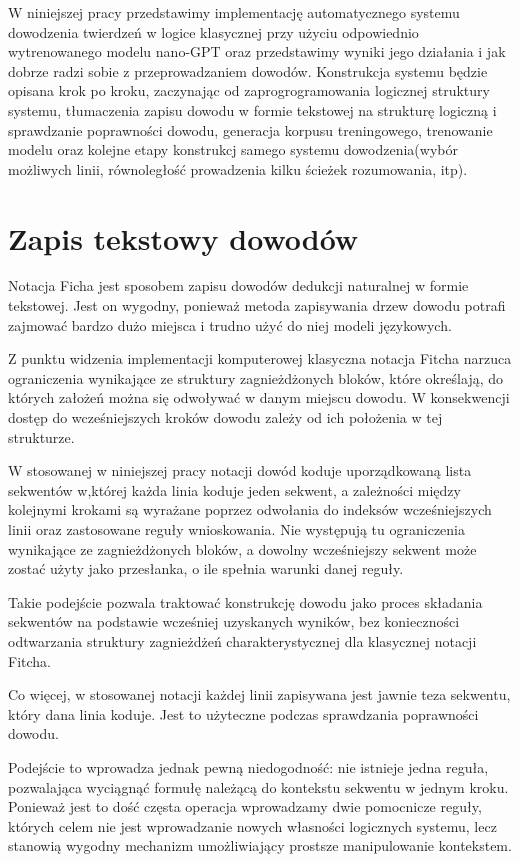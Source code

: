 \documentclass[shortabstract]{iithesis}
\theoremstyle{definition}
\theoremstyle{remark}
\theoremstyle{plain}
\begin{document}
W niniejszej pracy przedstawimy implementację automatycznego systemu dowodzenia twierdzeń w logice klasycznej przy użyciu odpowiednio 
wytrenowanego modelu nano-GPT oraz przedstawimy wyniki jego działania i jak dobrze radzi sobie z przeprowadzaniem dowodów. Konstrukcja
systemu będzie opisana krok po kroku, zaczynając od zaprogrogramowania logicznej struktury systemu, tłumaczenia zapisu dowodu w formie 
tekstowej na strukturę logiczną i sprawdzanie poprawności dowodu, generacja korpusu treningowego, trenowanie modelu oraz 
kolejne etapy konstrukcj samego systemu dowodzenia(wybór możliwych linii, równoległość prowadzenia kilku ścieżek rozumowania, itp).


\section{Zapis tekstowy dowodów}

Notacja Ficha jest sposobem zapisu dowodów dedukcji naturalnej w formie tekstowej. Jest on wygodny, ponieważ metoda zapisywania drzew dowodu potrafi zajmować bardzo dużo miejsca
i trudno użyć do niej modeli językowych. 

Z punktu widzenia implementacji komputerowej klasyczna notacja Fitcha narzuca
ograniczenia wynikające ze struktury zagnieżdżonych bloków, które określają,
do których założeń można się odwoływać w danym miejscu dowodu.
W konsekwencji dostęp do wcześniejszych kroków dowodu zależy od ich położenia
w tej strukturze.

W stosowanej w niniejszej pracy notacji dowód koduje uporządkowaną
lista sekwentów w,której każda linia koduje jeden sekwent, a zależności między kolejnymi krokami są wyrażane poprzez odwołania
do indeksów wcześniejszych linii oraz zastosowane reguły wnioskowania.
Nie występują tu ograniczenia wynikające ze zagnieżdżonych bloków, a dowolny wcześniejszy
sekwent może zostać użyty jako przesłanka, o ile spełnia warunki danej reguły.

Takie podejście pozwala traktować konstrukcję dowodu jako proces składania sekwentów
na podstawie wcześniej uzyskanych wyników, bez konieczności odtwarzania struktury
zagnieżdżeń charakterystycznej dla klasycznej notacji Fitcha.

Co więcej, w stosowanej notacji każdej linii zapisywana jest jawnie teza sekwentu, który dana linia koduje.
Jest to użyteczne podczas sprawdzania poprawności dowodu.

Podejście to wprowadza jednak pewną niedogodność: nie istnieje jedna reguła, pozwalająca wyciągnąć formułę należącą do kontekstu
sekwentu w jednym kroku. Ponieważ jest to dość częsta operacja wprowadzamy dwie pomocnicze reguły, których celem nie jest wprowadzanie
 nowych własności logicznych systemu, lecz stanowią wygodny mechanizm umożliwiający prostsze manipulowanie kontekstem.
\end{document}
